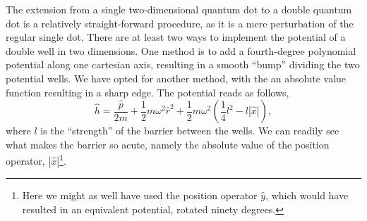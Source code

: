 The extension from a single two-dimensional quantum dot to a double 
quantum dot is a relatively straight-forward procedure, as it is 
a mere perturbation of the regular single dot. There are at least two ways to
implement the potential of a double well in two dimensions. One method 
is to add a fourth-degree polynomial potential along one cartesian axis, resulting 
in a smooth ``bump'' dividing the two potential wells. We have opted for another 
method, with the an absolute value function resulting in a sharp edge. The 
potential reads as follows,
\begin{equation}
    \label{eq:sharp_double_well_one_body}
    \hat{h} = \frac{\hat{p}}{2m} + \frac{1}{2}m \omega^2 \hat{r}^2
        + \frac{1}{2}m\omega^2\left(\frac{1}{4}l^2 - l |\hat{x}| \right),
\end{equation}
where $l$ is the ``strength'' of the barrier between the wells. We 
can readily see what makes the barrier so acute, namely the absolute 
value of the position operator, $|\hat{x}|$\footnote{Here we might as 
well have used the position operator $\hat{y}$, which would have resulted 
in an equivalent potential, rotated ninety degrees.}.

\begin{figure}[h]

\end{figure}

